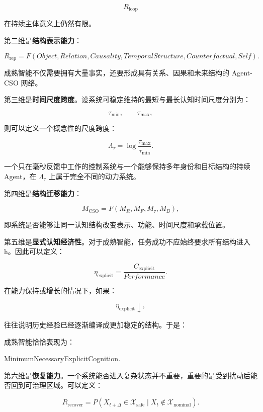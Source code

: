 \[
R_{\mathrm{loop}}
\]

在持续主体意义上仍然有限。

第二维是\textbf{结构表示能力}：

\[
R_{\mathrm{rep}}
=
F(
Object,
Relation,
Causality,
TemporalStructure,
Counterfactual,
Self
).
\]

成熟智能不仅需要拥有大量事实，还要形成具有关系、因果和未来结构的 Agent-CSO 网络。

第三维是\textbf{时间尺度跨度}。设系统可稳定维持的最短与最长认知时间尺度分别为：

\[
\tau_{\min},
\qquad
\tau_{\max},
\]

则可以定义一个概念性的尺度跨度：

\[
\Lambda_\tau
=
\log
\frac{\tau_{\max}}{\tau_{\min}}.
\]

一个只在毫秒反馈中工作的控制系统与一个能够保持多年身份和目标结构的持续 Agent，在 \(\Lambda_\tau\) 上属于完全不同的动力系统。

第四维是\textbf{结构迁移能力}：

\[
M_{\mathrm{CSO}}
=
F(
M_R,
M_F,
M_\tau,
M_B
),
\]

即系统是否能够让同一认知结构改变表示、功能、时间尺度和承载位置。

第五维是\textbf{显式认知经济性}。对于成熟智能，任务成功不应始终要求所有结构进入 h。因此可以定义：

\[
\eta_{\mathrm{explicit}}
=
\frac{
C_{\mathrm{explicit}}
}{
Performance
}.
\]

在能力保持或增长的情况下，如果：

\[
\eta_{\mathrm{explicit}}
\downarrow,
\]

往往说明历史经验已经逐渐编译成更加稳定的结构。于是：

\begin{statementbox}
\centering
{}
\end{statementbox}

成熟智能恰恰表现为：

\begin{statementbox}
MinimumNecessaryExplicitCognition.
\end{statementbox}

第六维是\textbf{恢复能力}。一个系统能否进入复杂状态并不重要，重要的是受到扰动后能否回到可治理区域。可以定义：

\[
R_{\mathrm{recover}}
=
P
\left(
X_{t+\Delta}
\in
\mathcal X_{\mathrm{safe}}
\mid
X_t
\notin
\mathcal X_{\mathrm{nominal}}
\right).
\]

